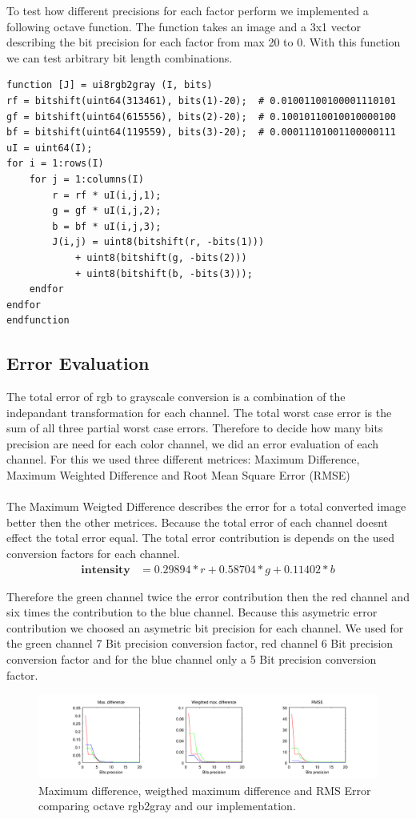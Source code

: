 \documentclass[a4paper]{scrartcl}
\begin{document}
	To test how different precisions for each factor perform we implemented a following octave function. The function takes an image and a 3x1 vector describing the bit precision for each factor from max 20 to 0. With this function we can test arbitrary bit length combinations.

\begin{minipage}{\linewidth}
\begin{lstlisting}
function [J] = ui8rgb2gray (I, bits)
rf = bitshift(uint64(313461), bits(1)-20);  # 0.01001100100001110101
gf = bitshift(uint64(615556), bits(2)-20);  # 0.10010110010010000100
bf = bitshift(uint64(119559), bits(3)-20);  # 0.00011101001100000111
uI = uint64(I);
for i = 1:rows(I)
	for j = 1:columns(I)
		r = rf * uI(i,j,1);
		g = gf * uI(i,j,2);
		b = bf * uI(i,j,3);
		J(i,j) = uint8(bitshift(r, -bits(1))) 
			+ uint8(bitshift(g, -bits(2))) 
			+ uint8(bitshift(b, -bits(3)));
	endfor
endfor
endfunction
\end{lstlisting}
\end{minipage}	

    \subsection{Error Evaluation}

	The total error of rgb to grayscale conversion is a combination of the indepandant transformation for each channel. The total worst case error is the sum of all three partial worst case errors. Therefore to decide how many bits precision are need for each color channel, we did an error evaluation of each channel. For this we used three different metrices: Maximum Difference, Maximum Weighted Difference and Root Mean Square Error (RMSE)

\paragraph{}
The Maximum Weigted Difference describes the error for a total converted image better then the other metrices. Because the total error of each channel doesnt effect the total error equal. The total error contribution is depends on the used conversion factors for each channel.
\begin{align*}
 \textbf{intensity} &= 0.29894*r + 0.58704*g + 0.11402*b
\end{align*}


Therefore the green channel twice the error contribution then the red channel and six times the contribution to the blue channel. Because this asymetric error contribution we choosed an asymetric bit precision for each channel. We used for the green channel 7 Bit precision conversion factor, red channel 6 Bit precision conversion factor and for the blue channel only a 5 Bit precision conversion factor.

\begin{figure}[h]
  \centering
  \includegraphics[width=\textwidth]{gray_error} 
  \caption{Maximum difference, weigthed maximum difference and RMS Error comparing octave rgb2gray and our implementation.}
\end{figure}
\end{document}
